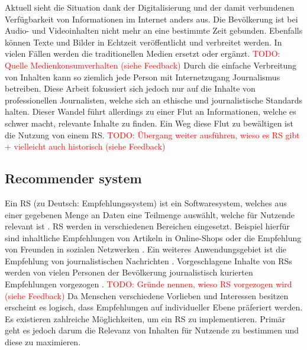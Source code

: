 Aktuell sieht die Situation dank der Digitalisierung und der damit verbundenen Verfügbarkeit von Informationen im Internet anders aus.
Die Bevölkerung ist bei Audio- und Videoinhalten nicht mehr an eine bestimmte Zeit gebunden.
Ebenfalls können Texte und Bilder in Echtzeit veröffentlicht und verbreitet werden.
In vielen Fällen werden die traditionellen Medien ersetzt oder ergänzt.
\textcolor{red}{TODO: Quelle Medienkonsumverhalten (siehe Feedback)}
Durch die einfache Verbreitung von Inhalten kann so ziemlich jede Person mit Internetzugang Journalismus betreiben.
Diese Arbeit fokussiert sich jedoch nur auf die Inhalte von professionellen Journalisten, welche sich an ethische und journalistische Standards halten.
Dieser Wandel führt allerdings zu einer Flut an Informationen, welche es schwer macht, relevante Inhalte zu finden.
Ein Weg diese Flut zu bewältigen ist die Nutzung von einem \ac{RS}.
\textcolor{red}{TODO: Übergang weiter ausführen, wieso es RS gibt + vielleicht auch historisch (siehe Feedback)}

\subsection{Recommender system}
Ein \acf{RS} (zu Deutsch: Empfehlungssystem) ist ein Softwaresystem, welches aus einer gegebenen Menge an Daten eine Teilmenge auswählt, welche für Nutzende relevant ist \cite{recommender-systems}.
\ac{RS} werden in verschiedenen Bereichen eingesetzt.
Beispiel hierfür sind inhaltliche Empfehlungen von Artikeln in Online-Shops oder die Empfehlung von Freunden in sozialen Netzwerken \cite{ecommerce-recommender, social-recommender}.
Ein weiteres Anwendungsgebiet ist die Empfehlung von journalistischen Nachrichten \cite{news-recommender}.
Vorgeschlagene Inhalte von \acp{RS} werden von vielen Personen der Bevölkerung journalistisch kurierten Empfehlungen vorgezogen \cite{recommender-preference, theory-of-machine}.
\textcolor{red}{TODO: Gründe nennen, wieso RS vorgezogen wird (siehe Feedback)}
Da Menschen verschiedene Vorlieben und Interessen besitzen erscheint es logisch, dass Empfehlungen auf individueller Ebene präferiert werden.
Es existieren zahlreiche Möglichkeiten, um ein \ac{RS} zu implementieren.
Primär geht es jedoch darum die Relevanz von Inhalten für Nutzende zu bestimmen und diese zu maximieren. \\

